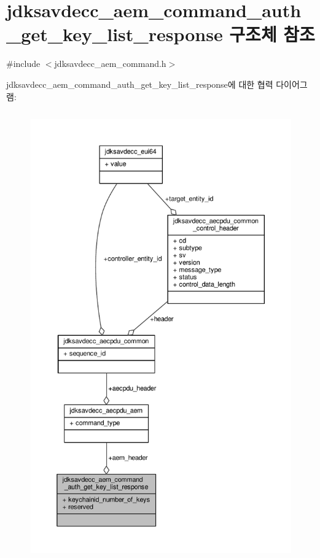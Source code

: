 \hypertarget{structjdksavdecc__aem__command__auth__get__key__list__response}{}\section{jdksavdecc\+\_\+aem\+\_\+command\+\_\+auth\+\_\+get\+\_\+key\+\_\+list\+\_\+response 구조체 참조}
\label{structjdksavdecc__aem__command__auth__get__key__list__response}


{\ttfamily \#include $<$jdksavdecc\+\_\+aem\+\_\+command.\+h$>$}



jdksavdecc\+\_\+aem\+\_\+command\+\_\+auth\+\_\+get\+\_\+key\+\_\+list\+\_\+response에 대한 협력 다이어그램\+:
\nopagebreak
\begin{figure}[H]
\begin{center}
\leavevmode
\includegraphics[height=550pt]{structjdksavdecc__aem__command__auth__get__key__list__response__coll__graph}
\end{center}
\end{figure}
